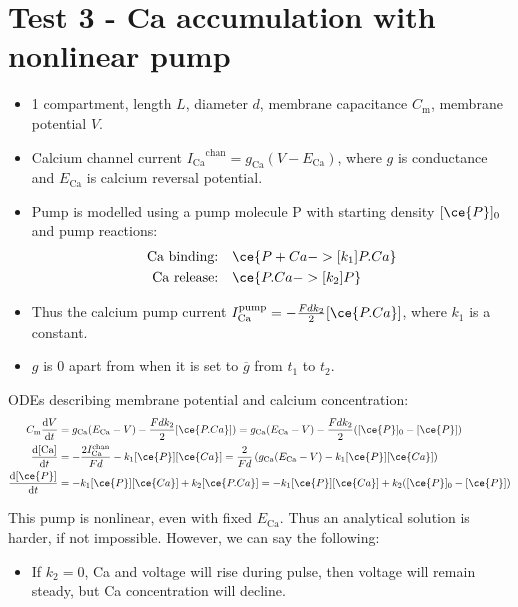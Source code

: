 \documentclass{article}
\newcommand{\ICa}{\ensuremath{I_\mathrm{Ca}}\xspace}
\newcommand{\gCa}{\ensuremath{g_\mathrm{Ca}}\xspace}
\newcommand{\ECa}{\ensuremath{E_\mathrm{Ca}}\xspace}
\newcommand{\Cmem}{\ensuremath{C_\mathrm{m}}\xspace}
\newcommand{\dif}{\textrm{d}}
\newcommand{\cCa}{[\textrm{Ca}]}
\begin{document}
\clearpage

\section{Test 3 - Ca accumulation with nonlinear pump}
\label{tests:sec:test-3-ca}

\begin{itemize}
\item 1 compartment, length $L$, diameter $d$, membrane capacitance
  \Cmem, membrane potential $V$.
\item Calcium channel current $\ICa^\mathrm{chan}=\gCa(V-\ECa)$, where
  $g$ is conductance and $\ECa$ is calcium reversal potential.
\item Pump is modelled using a pump molecule P with starting density
  $[\ce{P}]_0$ and pump reactions:
  \begin{equation}
    \label{tests:eq:3}
    \begin{aligned}
      \textrm{Ca binding:}\quad & \ce{P + Ca  ->[k_1] P.Ca} \\
      \textrm{Ca release:}\quad & \ce{P.Ca  ->[k_2] P}
    \end{aligned}
  \end{equation}
\item Thus the calcium pump current $\ICa^\mathrm{pump}=-
  \frac{Fdk_2}{2}[\ce{P.Ca}]$, where $k_1$ is a constant.
\item $g$ is 0 apart from when it is set to $\overline{g}$ from $t_1$
  to $t_2$.
\end{itemize}

ODEs describing membrane potential and calcium concentration:
\begin{equation}
  \begin{aligned}
    \Cmem\frac{\dif V}{\dif t}  &
    = \gCa(\ECa - V) - \frac{Fdk_2}{2}[\ce{P.Ca}] ) 
    = \gCa(\ECa - V) - \frac{Fdk_2}{2}([\ce{P}]_0 - [\ce{P}] ) \\
    \frac{\dif\cCa}{\dif t} &
    = -\frac{2\ICa^\mathrm{chan}}{Fd}     - k_1[\ce{P}][\ce{Ca}] 
    = \frac{2}{Fd} \left(\gCa(\ECa - V) - k_1[\ce{P}][\ce{Ca}] \right) \\
    \frac{\dif[\ce{P}]}{\dif t} &
    =  -k_1[\ce{P}][\ce{Ca}] + k_2[\ce{P.Ca}] 
    = -k_1[\ce{P}][\ce{Ca}] + k_2([\ce{P}]_0 - [\ce{P}])
  \end{aligned}
\end{equation}

This pump is nonlinear, even with fixed $E_{\mathrm{Ca}}$. Thus an
analytical solution is harder, if not impossible. However, we can say
the following:
\begin{itemize}
\item If $k_2=0$, Ca and voltage will rise during pulse, then voltage
  will remain steady, but Ca concentration will decline.
\end{itemize}
\end{document}
